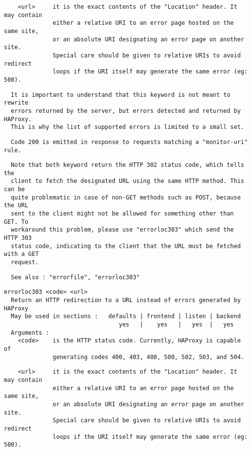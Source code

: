 \begin{verbatim}
    <url>     it is the exact contents of the "Location" header. It may contain
              either a relative URI to an error page hosted on the same site,
              or an absolute URI designating an error page on another site.
              Special care should be given to relative URIs to avoid redirect
              loops if the URI itself may generate the same error (eg: 500).
\end{verbatim}

\begin{verbatim}
  It is important to understand that this keyword is not meant to rewrite
  errors returned by the server, but errors detected and returned by HAProxy.
  This is why the list of supported errors is limited to a small set.
\end{verbatim}

\begin{verbatim}
  Code 200 is emitted in response to requests matching a "monitor-uri" rule.
\end{verbatim}

\begin{verbatim}
  Note that both keyword return the HTTP 302 status code, which tells the
  client to fetch the designated URL using the same HTTP method. This can be
  quite problematic in case of non-GET methods such as POST, because the URL
  sent to the client might not be allowed for something other than GET. To
  workaround this problem, please use "errorloc303" which send the HTTP 303
  status code, indicating to the client that the URL must be fetched with a GET
  request.
\end{verbatim}

\begin{verbatim}
  See also : "errorfile", "errorloc303"
\end{verbatim}

\begin{verbatim}
errorloc303 <code> <url>
  Return an HTTP redirection to a URL instead of errors generated by HAProxy
  May be used in sections :   defaults | frontend | listen | backend
                                 yes   |    yes   |   yes  |   yes
  Arguments :
    <code>    is the HTTP status code. Currently, HAProxy is capable of
              generating codes 400, 403, 408, 500, 502, 503, and 504.
\end{verbatim}

\begin{verbatim}
    <url>     it is the exact contents of the "Location" header. It may contain
              either a relative URI to an error page hosted on the same site,
              or an absolute URI designating an error page on another site.
              Special care should be given to relative URIs to avoid redirect
              loops if the URI itself may generate the same error (eg: 500).
\end{verbatim}

